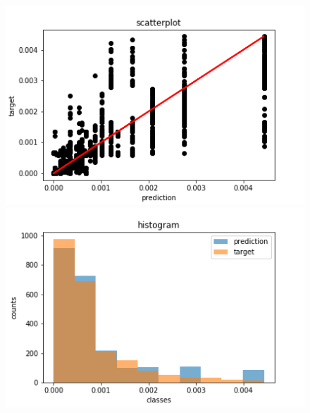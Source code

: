 
\begin{figure}[H]
%
  \centering
    \includegraphics[width=0.9\linewidth]{img/GN_exp1/28bins/scatter_plot_20epochs.png}
\endminipage
{}%
  \centering
    \includegraphics[width=0.9\linewidth]{img/GN_exp1/28bins/histogram_20epochs.png}

\end{figure}
